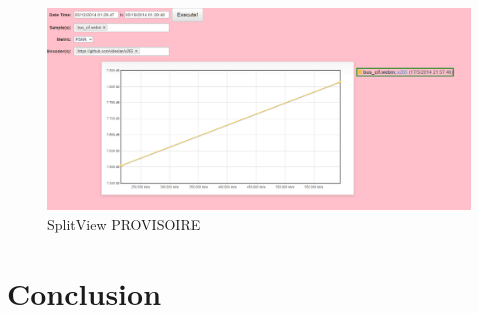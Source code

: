 \documentclass[a4paper,12pt]{article}
\begin{document}
\begin{figure}[!h]
	\centering
	\includegraphics[width=1\textwidth]{figures/graph1.png}
	\caption{SplitView PROVISOIRE}
	\label{fig:graph1}
\end{figure}




\section{Conclusion}
\end{document}
